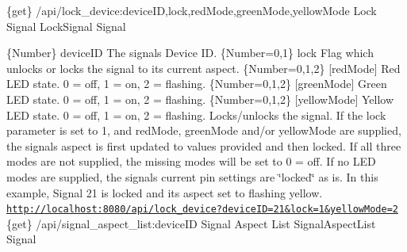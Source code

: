 \{get\} /api/lock\+\_\+device\+:device\+ID,lock,red\+Mode,green\+Mode,yellow\+Mode Lock Signal  Lock\+Signal  Signal

\{Number\} device\+ID The signal\textquotesingle{}s Device ID.  \{Number=0,1\} lock Flag which unlocks or locks the signal to its current aspect.  \{Number=0,1,2\} \mbox{[}red\+Mode\mbox{]} Red L\+ED state. 0 = off, 1 = on, 2 = flashing.  \{Number=0,1,2\} \mbox{[}green\+Mode\mbox{]} Green L\+ED state. 0 = off, 1 = on, 2 = flashing.  \{Number=0,1,2\} \mbox{[}yellow\+Mode\mbox{]} Yellow L\+ED state. 0 = off, 1 = on, 2 = flashing.  Locks/unlocks the signal. If the lock parameter is set to 1, and red\+Mode, green\+Mode and/or yellow\+Mode are supplied, the signal\textquotesingle{}s aspect is first updated to values provided and then locked. If all three modes are not supplied, the missing modes will be set to 0 = off. If no L\+ED modes are supplied, the signal\textquotesingle{}s current pin settings are \char`\"{}locked\char`\"{} as is.  In this example, Signal 21 is locked and its aspect set to flashing yellow. \href{http://localhost:8080/api/lock_device?deviceID=21&lock=1&yellowMode=2}{\tt http\+://localhost\+:8080/api/lock\+\_\+device?device\+I\+D=21\&lock=1\&yellow\+Mode=2}  \{get\} /api/signal\+\_\+aspect\+\_\+list\+:device\+ID Signal Aspect List  Signal\+Aspect\+List  Signal

